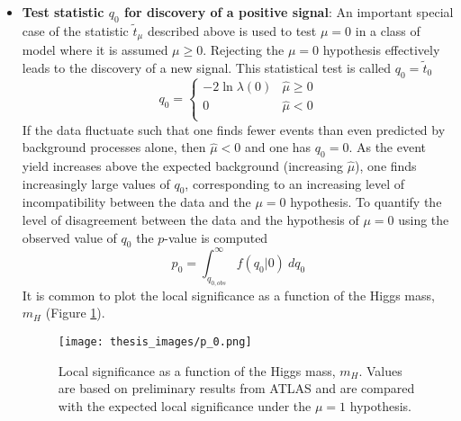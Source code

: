 \documentclass[a4paper, oneside, 11pt, openright]{book}
\begin{document}
\begin{itemize}
 				\item  \textbf{Test statistic $q_0$ for discovery of a positive signal}: An important special case of the statistic $\tilde{t}_\mu$ described above is used to test $\mu = 0$ in a class of model where it is assumed $\mu \geq 0$. Rejecting the $\mu=0$ hypothesis effectively leads to the discovery of a new signal. This statistical test is called $q_0=\tilde{t}_0$
 				\begin{equation}\label{eq:q_0}
 					q_0 = 
 					\begin{cases}
 						-2\ln\lambda(0) & \hat{\mu}\geq0 \\
 						0 & \hat{\mu}<0 \\
 					\end{cases}
 				\end{equation}
 				If the data fluctuate such that one finds fewer events than even predicted by background processes alone, then $\hat{\mu}<0$ and one has $q_0 = 0$. As the event yield increases above the expected background (increasing $\hat{\mu}$), one finds increasingly large values of $q_0$, corresponding to an increasing level of incompatibility between the data and the $\mu=0$ hypothesis. To quantify the level of disagreement between the data and the hypothesis of $\mu=0$ using the observed value of $q_0$ the $p$-value is computed
 				\begin{equation}\label{eq:p_0}
 					p_0 = \int_{q_{0,obs}}^{\infty} f(q_0|0)\ dq_0
 				\end{equation}
 				It is common to plot the local significance as a function of the Higgs mass, $m_H$ (Figure \ref{fig:p_0}).
 				\begin{figure}
 					\centering
 					\texttt{[image: thesis\_images/p\_0.png]}			
 					\caption{Local significance as a function of the Higgs mass, $m_H$. Values are based on preliminary results from ATLAS and are compared with the expected local significance under the $\mu=1$ hypothesis.}
 					\label{fig:p_0}
 				\end{figure}
 			

\end{itemize}
\end{document}
